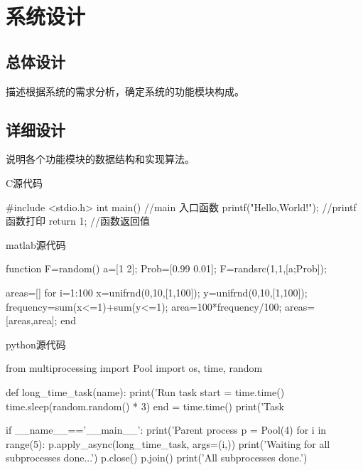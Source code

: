 

\chapter{系统设计}

\section{总体设计}
描述根据系统的需求分析，确定系统的功能模块构成。

\section{详细设计}
说明各个功能模块的数据结构和实现算法。


C源代码
\begin{clan}
    #include <stdio.h>  
    int main()                  //main 入口函数  
    {  
        printf("Hello,World!"); //printf 函数打印  
        return 1;               //函数返回值  
    }   
\end{clan}


matlab源代码
    \begin{matlab}
    function F=random()
    a=[1 2];
    Prob=[0.99 0.01];
    F=randsrc(1,1,[a;Prob]);

    areas=[]
    for i=1:100
    x=unifrnd(0,10,[1,100]);
    y=unifrnd(0,10,[1,100]);
    frequency=sum(x<=1)+sum(y<=1);
    area=100*frequency/100;
    areas=[areas,area];
    end
\end{matlab}


python源代码
\begin{python}
    from multiprocessing import Pool
    import os, time, random

    def long_time_task(name):
        print('Run task %
        start = time.time()
        time.sleep(random.random() * 3)
        end = time.time()
        print('Task %

    if __name__=='__main__':
        print('Parent process %
        p = Pool(4)
        for i in range(5):
        p.apply_async(long_time_task, args=(i,))
        print('Waiting for all subprocesses done...')
        p.close()
        p.join()
        print('All subprocesses done.')
\end{python}





